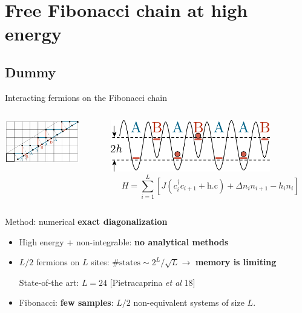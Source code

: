 \section{Free Fibonacci chain at high energy}
\subsection{Dummy}
\begin{frame}{Interacting fermions on the Fibonacci chain}
\begin{columns}
\begin{column}{0.5\textwidth}
\centering
\includegraphics[width=0.8\textwidth]{img/3_Fibonacci/full_cp}
\end{column}
\begin{column}{0.5\textwidth}
\centering
\includegraphics[width=0.8\textwidth]{img/3_Fibonacci/XXZ_QP_cold_atoms}
\[
	H = \sum_{i=1}^L \left[ J (c_i^\dagger c_{i+1} + \text{h.c}) + \Delta n_i n_{i+1} - h_i n_i \right]
\]
\end{column}
\end{columns}
\begin{block}{Method: numerical \textbf{exact diagonalization}}
\begin{itemize}
	\item High energy + non-integrable: \textbf{no analytical methods}
	\item $L/2$ fermions on $L$ sites: $\# \text{states} \sim 2^L/\sqrt{L} \to$ \textbf{memory is limiting}

State-of-the art: $L=24$ {\footnotesize[Pietracaprina \emph{et al} 18]}

	\item Fibonacci: \textbf{few samples}: $L/2$ non-equivalent systems of size $L$.
\end{itemize}
\end{block}
\end{frame}

